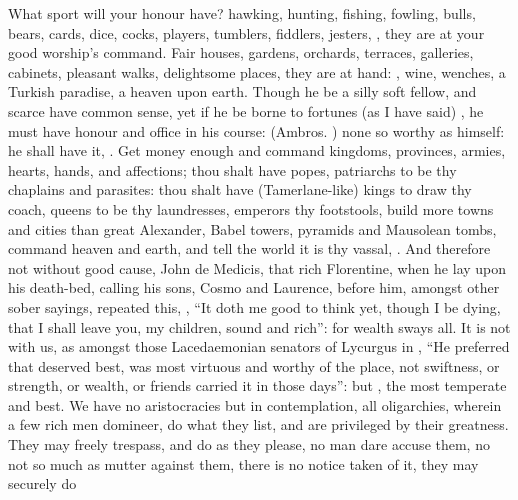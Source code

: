 What sport will your honour have? hawking, hunting, fishing, fowling, bulls,
bears, cards, dice, cocks, players, tumblers, fiddlers, jesters, \etc{}, they
are at your good worship's command. Fair houses, gardens, orchards, terraces,
galleries, cabinets, pleasant walks, delightsome places, they are at hand:
, wine, wenches, \etc{} a Turkish paradise, a heaven upon
earth. Though he be a silly soft fellow, and scarce have common sense, yet if
he be borne to fortunes (as I have said) , he must have honour and office in his course:
 (Ambros.
) none so worthy as himself: he shall have it,
. Get money enough and command
kingdoms, provinces, armies, hearts, hands, and
affections; thou shalt have popes, patriarchs to be thy chaplains and
parasites: thou shalt have (Tamerlane-like) kings to draw thy coach, queens to
be thy laundresses, emperors thy footstools, build more towns and cities than
great Alexander, Babel towers, pyramids and Mausolean tombs, \etc{} command
heaven and earth, and tell the world it is thy vassal, . And therefore not without good cause, John
de Medicis, that rich Florentine, when he lay upon his death-bed, calling his
sons, Cosmo and Laurence, before him, amongst other sober sayings, repeated
this, ,
\enquote{It doth me good to think yet, though I be dying, that I shall leave you, my
children, sound and rich}: for wealth sways all. It is not with us, as amongst
those Lacedaemonian senators of Lycurgus in \Plutarch{}, \enquote{He preferred that
deserved best, was most virtuous and worthy of the place,
not swiftness, or strength, or wealth, or friends carried
it in those days}: but , the most temperate and best. We have no aristocracies but in
contemplation, all oligarchies, wherein a few rich men domineer, do what they
list, and are privileged by their greatness. They may
freely trespass, and do as they please, no man dare accuse them, no not so much
as mutter against them, there is no notice taken of it, they may securely do
